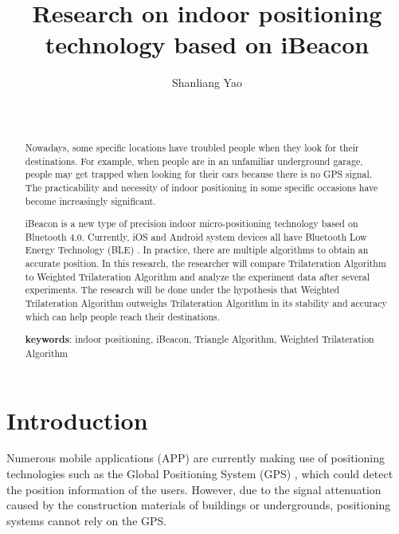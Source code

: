 \documentclass{sigchi}
\begin{document}
\title{Research on indoor positioning technology based on iBeacon}

\author{
  \alignauthor Shanliang Yao\\
    \\
    \\
}

\maketitle

\begin{abstract}
Nowadays, some specific locations have troubled people when they look for their destinations. For example, when people are in an unfamiliar underground garage, people may get trapped when looking for their cars because there is no GPS signal. The practicability and necessity of indoor positioning in some specific occasions have become increasingly significant.

iBeacon is a new type of precision indoor micro-positioning technology based on Bluetooth 4.0. Currently, iOS and Android system devices all have Bluetooth Low Energy Technology (BLE) \cite{gomez2012overview}. In practice, there are multiple algorithms to obtain an accurate position. In this research, the researcher will compare Trilateration Algorithm to Weighted Trilateration Algorithm and analyze the experiment data after several experiments. The research will be done under the hypothesis that Weighted Trilateration Algorithm outweighs Trilateration Algorithm in its stability and accuracy which can help people reach their destinations. 

\textbf{keywords}: indoor positioning, iBeacon, Triangle Algorithm, Weighted Trilateration Algorithm
\end{abstract}

\section{Introduction}

Numerous mobile applications (APP) are currently making use of positioning technologies such as the Global Positioning System (GPS) \cite{misra2006global}, which could detect the position information of the users. However, due to the signal attenuation caused by the construction materials of buildings or undergrounds, positioning systems cannot rely on the GPS.
\end{document}
